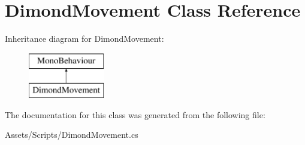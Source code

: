 \hypertarget{class_dimond_movement}{}\section{Dimond\+Movement Class Reference}
\label{class_dimond_movement}
Inheritance diagram for Dimond\+Movement\+:\begin{figure}[H]
\begin{center}
\leavevmode
\includegraphics[height=2.000000cm]{class_dimond_movement}
\end{center}
\end{figure}


The documentation for this class was generated from the following file\+:\begin{DoxyCompactItemize}
\item 
Assets/\+Scripts/Dimond\+Movement.\+cs\end{DoxyCompactItemize}
